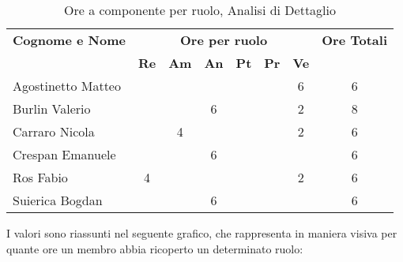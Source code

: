 \begin{table}[h]
	\centering
	\begin{tabular}{|l|c|c|c|c|c|c|c|}
		\toprule
		\textbf{Cognome e Nome} & \multicolumn{6}{c}{\textbf{Ore per ruolo}} & \textbf{Ore Totali} \\
		& \textbf{Re} & \textbf{Am} & \textbf{An} & \textbf{Pt} & \textbf{Pr} & \textbf{Ve} & \\
		
		\midrule
		Agostinetto Matteo & & & & & & 6 & 6 \\
		Burlin Valerio & & & 6 & & & 2 & 8 \\ 
		Carraro Nicola & & 4 & & & & 2 & 6 \\
		Crespan Emanuele & & & 6 & & & & 6 \\
		Ros Fabio & 4 & & & & & 2 & 6 \\
		Suierica Bogdan & & & 6 & & & & 6 \\
		
		\bottomrule
	\end{tabular}
	\caption{Ore a componente per ruolo, Analisi di Dettaglio}
\end{table}

\noindent I valori sono riassunti nel seguente grafico, che rappresenta in maniera visiva per quante ore un membro abbia ricoperto un determinato ruolo:

